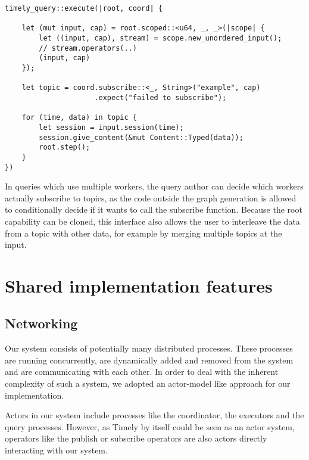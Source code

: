 \begin{lstlisting}[caption={[Typical use of the subscription handle]
Typical use of the subscription handle. This query subscribes to a single topic of
strings, with \lstinline{u64} being the type of the timestamps.
}]
timely_query::execute(|root, coord| {

    let (mut input, cap) = root.scoped::<u64, _, _>(|scope| {
        let ((input, cap), stream) = scope.new_unordered_input();
        // stream.operators(..)
        (input, cap)
    });

    let topic = coord.subscribe::<_, String>("example", cap)
                     .expect("failed to subscribe");

    for (time, data) in topic {
        let session = input.session(time);
        session.give_content(&mut Content::Typed(data));
        root.step();
    }
})
\end{lstlisting}

In queries which use multiple workers, the query author can decide which workers
actually subscribe to topics, as the code outside the graph generation is allowed
to conditionally decide if it wants to call the subscribe function. Because
the root capability can be cloned, this interface also allows the user to
interleave the data from a topic with other data, for example by merging
multiple topics at the input.



\section{Shared implementation features}

\subsection{Networking}

Our system consists of potentially many distributed processes. These processes
are running concurrently, are dynamically added and removed from the system
and are communicating with each other. In order to deal with the inherent
complexity of such a system, we adopted an actor-model like approach for our
implementation.

Actors in our system include processes like the coordinator, the executors 
and the query processes. However, as Timely by itself could be seen as an
actor system, operators like the publish or subscribe operators are also actors
directly interacting with our system.

